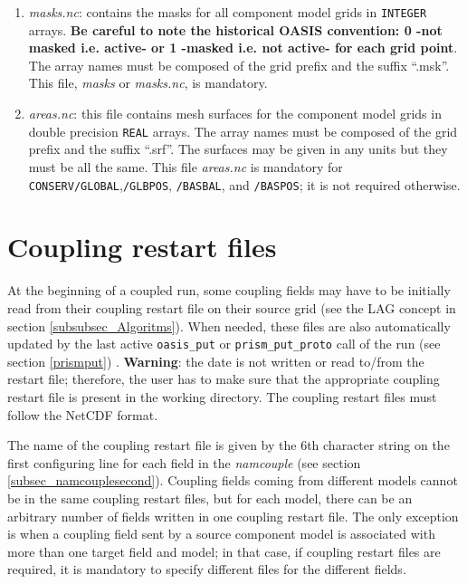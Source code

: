 \begin{enumerate}
\item {\em masks.nc}: contains the masks for all component model grids
  in {\tt INTEGER} arrays. {\bf Be careful to note the historical
    OASIS convention: 0 -not masked i.e.  active- or 1 -masked
    i.e. not active- for each grid point}. The array names must be
  composed of the grid prefix and the suffix ``.msk''. This file, {\em
    masks} or {\em masks.nc}, is mandatory.

\item {\em areas.nc}: this file contains mesh surfaces for the
  component model grids in double precision {\tt REAL} arrays. The
  array names must be composed of the grid prefix and the suffix
  ``.srf''.  The surfaces may be given in any units but they must be
  all the same. This file {\em areas.nc} is mandatory for {\tt
    CONSERV/GLOBAL},{\tt /GLBPOS}, {\tt /BASBAL}, and {\tt /BASPOS};
  it is not required otherwise.

\end{enumerate}

\section{Coupling restart files}
\label{subsec_restartdata}

At the beginning of a coupled run, some coupling fields may have to be
initially read from their coupling restart file on their source grid
(see the LAG concept in section \ref{subsubsec_Algoritms}). When
needed, these files are also automatically updated by the last active
{\tt oasis\_put} or {\tt prism\_put\_proto} call of the run (see
section \ref{prismput}) .
{\bf Warning}: the date is not written or read to/from the restart
file; therefore, the user has to make sure that the appropriate
coupling restart file is present in the working directory. The
coupling restart files must follow the NetCDF format.


The name of the coupling restart file is given by the 6th character
string on the first configuring line for each field in the {\it
  namcouple} (see section \ref{subsec_namcouplesecond}). Coupling
fields coming from different models cannot be in the same coupling
restart files, but for each model, there can be an arbitrary number of
fields written in one coupling restart file. The only exception is when a coupling field sent by a source component model is associated with more than one target field and model; in that case, if coupling restart files are required, it is mandatory to specify different files for the different fields. 

